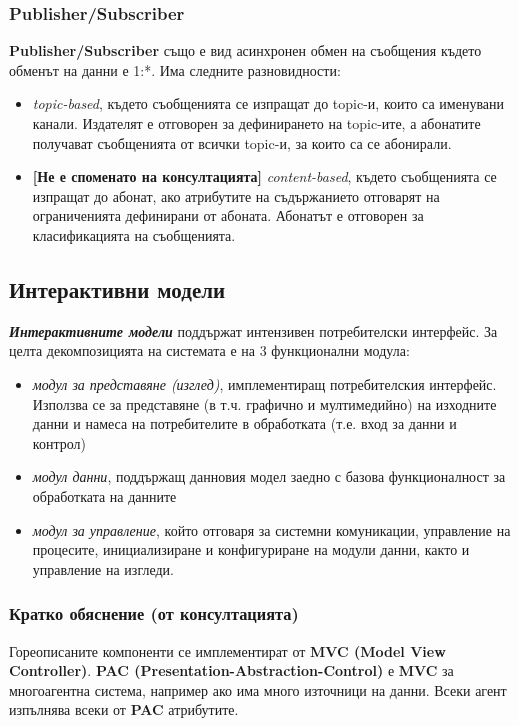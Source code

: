 \documentclass{scrartcl}
\begin{document}
\begin{FlushLeft}
\subsubsection{Publisher/Subscriber}
\textbf{Publisher/Subscriber} също е вид асинхронен обмен на съобщения където обменът на данни е 1:*.
Има следните разновидности:
\begin{itemize}
    \item \textit{topic-based}, където съобщенията се изпращат до topic-и, които са именувани канали.
    Издателят е отговорен за дефинирането на topic-ите, а абонатите получават съобщенията от всички topic-и, за които са се абонирали.
    \item \textbf{[Не е споменато на консултацията]} \textit{content-based}, където съобщенията се изпращат до абонат, ако атрибутите на съдържанието отговарят на ограниченията дефинирани от абоната.
    Абонатът е отговорен за класификацията на съобщенията.
\end{itemize}

\subsection{Интерактивни модели}

\textbf{\textit{Интерактивните модели}} поддържат интензивен потребителски интерфейс.
За целта декомпозицията на системата е на 3 функционални модула:
\begin{itemize}
    \item \textit{модул за представяне (изглед)}, имплементиращ потребителския интерфейс.
    Използва се за представяне (в т.ч. графично и мултимедийно) на изходните данни и намеса на потребителите в обработката (т.е. вход за данни и контрол)
    \item \textit{модул данни}, поддържащ данновия модел заедно с базова функционалност за обработката на данните
    \item \textit{модул за управление}, който отговаря за системни комуникации, управление на процесите, инициализиране и конфигуриране на модули данни, както и управление на изгледи.
\end{itemize}

\subsubsection{Кратко обяснение (от консултацията)}
Гореописаните компоненти се имплементират от \textbf{MVC (Model View Controller)}. 
\textbf{PAC (Presentation-Abstraction-Control)} е \textbf{MVC} за многоагентна система, например 
ако има много източници на данни. Всеки агент изпълнява всеки от \textbf{PAC} атрибутите.


\end{FlushLeft}
\end{document}
